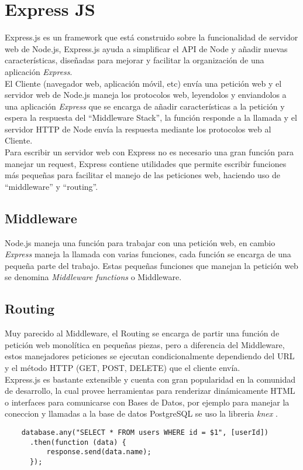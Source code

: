 \section{Express JS}
\label{sec:express_js}
  Express.js es un framework que está construido sobre la funcionalidad de servidor web de Node.js, Express.js ayuda a simplificar el API de Node y añadir nuevas características, diseñadas para mejorar y facilitar la organización de una aplicación \emph{Express}.\\

  El Cliente (navegador web, aplicación móvil, etc) envía una petición web y el servidor web de Node.js maneja los protocolos web, leyendolos y enviandolos a una aplicación \emph{Express} que se encarga de añadir características a la petición y espera la respuesta del ``Middleware Stack'', la función responde a la llamada y el servidor HTTP de Node envía la respuesta mediante los protocolos web al Cliente.\\

  Para escribir un servidor web con Express no es necesario una gran función para manejar un request, Express contiene utilidades que permite escribir funciones más pequeñas para facilitar el manejo de las peticiones web, haciendo uso de ``middleware'' y ``routing''.

  \subsection{Middleware}
  \label{sub:middleware}
    Node.js maneja una funci\'on para trabajar con una petición web, en cambio \emph{Express} maneja la llamada con varias funciones, cada función se encarga de una pequeña parte del trabajo. Estas pequeñas funciones que manejan la petición web se denomina \emph{Middleware functions} o Middleware.


  \subsection{Routing}
  \label{sub:routing}
    Muy parecido al Middleware, el Routing se encarga de partir una función de petición web monolítica en pequeñas piezas, pero a diferencia del Middleware, estos manejadores peticiones se ejecutan condicionalmente dependiendo del URL y el método HTTP (GET, POST, DELETE) que el cliente envía.\\


  Express.js es bastante extensible y cuenta con gran popularidad en la comunidad de desarrollo, la cual provee herramientas para renderizar dinámicamente HTML o interfaces para comunicarse con Bases de Datos, por ejemplo para manejar la coneccion y llamadas a la base de datos PostgreSQL se uso la libreria \emph{knex} .

  \begin{verbatim}
    database.any("SELECT * FROM users WHERE id = $1", [userId])
      .then(function (data) {
          response.send(data.name);
      });
  \end{verbatim}

